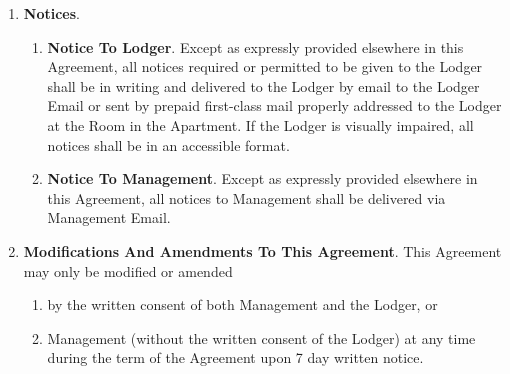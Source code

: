 \documentclass[12pt,letterpaper]{article}
\newcommand{\lodger}{Lodger}
\newcommand{\management}{Management}
\newcommand{\myemail}{Management Email}
\newcommand{\apt}{Apartment}
\newcommand{\room}{Room}
\newcommand{\lemail}{Lodger Email}
\begin{document}
\begin{enumerate}
\begin{enumerate}
			\item \textbf{Service Of Termination Notice}. \label{service}
				When a notice of termination requires service pursuant to California Code of Civil Procedure 1162, such service may be made by either: 
				\begin{enumerate}
					\item Personally delivering a copy to the \lodger{}; or, 
					\item If the \lodger{} is absent from the \room{} and from their usual place of business, service may be made by leaving a copy with some person of suitable age and discretion at their usual place of business, and sending a copy through the mail addressed to the \lodger{} at \apt{}; or, 
					\item If such place of business cannot be ascertained, or a person of suitable age or discretion there cannot be found, then service may be made by affixing a copy in a conspicuous place in the \room{}, and also sending a copy through the mail addressed to the \lodger{} at \apt{}.
				\end{enumerate}
		\end{enumerate}
	\item \textbf{Notices}. 
		\begin{enumerate} 
			\item \textbf{Notice To \lodger{}}. 
				Except as expressly provided elsewhere in this Agreement, all notices required or permitted to be given to the \lodger{} shall be in writing and delivered to the \lodger{} by email to the \lemail{} or sent by prepaid first-class mail properly addressed to the \lodger{} at the \room{} in the \apt{}. If the \lodger{} is visually impaired, all notices shall be in an accessible format. 
			\item \textbf{Notice To Management}. 
				Except as expressly provided elsewhere in this Agreement, all notices to \management{} shall be delivered via \myemail{}.
		\end{enumerate}
	\item \textbf{Modifications And Amendments To This Agreement}. \label{modifications}
		This Agreement may only be modified or amended 
		\begin{enumerate}
			\item by the written consent of both \management{} and the \lodger{}, or 
			\item \management{} (without the written consent of the \lodger{}) at any time during the term of the Agreement upon 7 day written notice. 
		\end{enumerate}
				

\end{enumerate}
\end{document}
